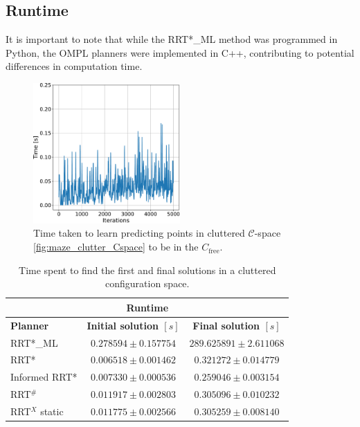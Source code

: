 \documentclass{ctuthesis}
\begin{document}
\subsection{Runtime}
It is important to note that while the RRT*\_ML method was programmed in Python, 
the OMPL planners were implemented in C++, 
contributing to potential differences in computation time.
\begin{figure}[!ht]
  \centering 
  \includegraphics[width=0.5\textwidth]{figChap5/graph_clutter_learning_time.pdf}   
  \caption{Time taken to learn predicting points in cluttered $\mathcal{C}$-space \ref{fig:maze_clutter_Cspace} 
  to be in the \(C_{\text{free}}\).}
  \label{fig:graph_learning_time}
\end{figure}
\begin{table}[!ht]
  \centering
  \begin{tabular}{ |p{3cm}|c|c| }
    \hline
    \multicolumn{3}{|c|}{\textbf{Runtime}} \\
    \hline
    \textbf{Planner} & \textbf{Initial solution $[s]$} & \textbf{Final solution $[s]$} \\
    \hline
    RRT*\_ML         & $0.278594 \pm 0.157754$ & $289.625891 \pm 2.611068$ \\
    RRT*             & $0.006518 \pm 0.001462$ & $0.321272 \pm 0.014779$ \\
    Informed RRT*    & $0.007330 \pm 0.000536$ & $0.259046 \pm 0.003154$ \\
    RRT$^\#$         & $0.011917 \pm 0.002803$ & $0.305096 \pm 0.010232$ \\
    RRT$^X$ static   & $0.011775 \pm 0.002566$ & $0.305259 \pm 0.008140$ \\
    \hline
  \end{tabular}
  \caption{Time spent to find the first and final solutions in a cluttered configuration space.}
  \label{tab:time_clutter2D}
\end{table}
\end{document}
